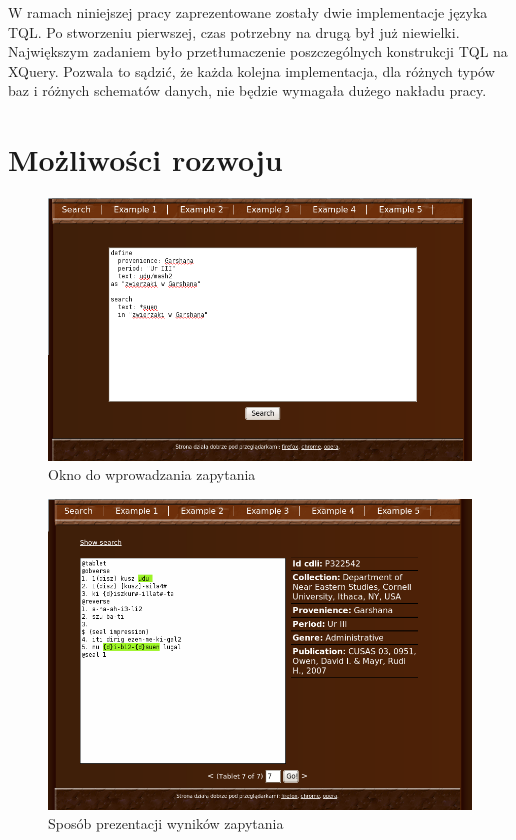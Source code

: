 W ramach niniejszej pracy zaprezentowane zostały dwie implementacje języka TQL. 
Po stworzeniu pierwszej, czas potrzebny na drugą był już niewielki. 
Największym zadaniem było przetłumaczenie poszczególnych konstrukcji TQL na XQuery. 
Pozwala to sądzić, że każda kolejna implementacja, dla różnych typów baz i różnych schematów danych, 
nie będzie wymagała dużego nakładu pracy. 

\newpage 

\section*{Możliwości rozwoju}
\begin{figure}[h]
 \centering
 \includegraphics[width=450px]{../diagramy/wyszuk_zapyt.png}
 \caption{Okno do wprowadzania zapytania}
 \label{fig:wyszuk_zapyt}
\end{figure}

\begin{figure}[h]
 \centering
 \includegraphics[width=450px]{../diagramy/wyszuk_wynik.png}
 \caption{Sposób prezentacji wyników zapytania}
 \label{fig:wyszuk_wynik}
\end{figure}

